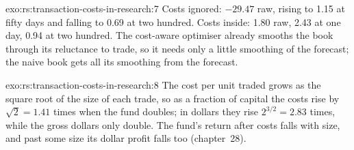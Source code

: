 \begin{solution}{exo:rs:transaction-costs-in-research:7}
Costs ignored: $-29.47$ raw, rising to 1.15 at fifty days and falling to 0.69 at two hundred. Costs inside: 1.80 raw, 2.43 at one day, 0.94 at two hundred. The
cost-aware optimiser already smooths the book through its reluctance to trade, so it needs only a little smoothing of the forecast; the naive book gets all its
smoothing from the forecast.
\end{solution}

\begin{solution}{exo:rs:transaction-costs-in-research:8}
The cost per unit traded grows as the square root of the size of each trade, so as a fraction of capital the costs rise by $\sqrt 2 = 1.41$ times when the fund
doubles; in dollars they rise $2^{3/2} = 2.83$ times, while the gross dollars only double. The fund's return after costs falls with size, and past some size its
dollar profit falls too (chapter~28).
\end{solution}

